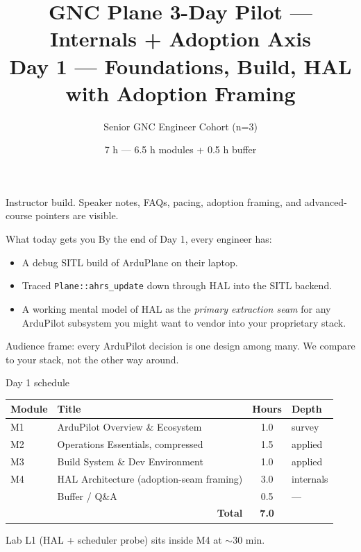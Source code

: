 \documentclass[aspectratio=169,11pt]{beamer}
\title{GNC Plane 3-Day Pilot --- Internals + Adoption Axis\\\large Day 1 --- Foundations, Build, HAL with Adoption Framing}
\subtitle{Senior GNC Engineer Cohort (n=3)}
\date{7 h --- 6.5 h modules + 0.5 h buffer}
\author{}
\institute{\copyrightline}
\begin{document}
\begin{frame}
  \titlepage
  \ifinstructor
    \footnotesize Instructor build. Speaker notes, FAQs, pacing, adoption framing, and advanced-course pointers are visible.
  \fi
\end{frame}

\begin{frame}[allowframebreaks]{What today gets you}
  By the end of Day 1, every engineer has:
  \begin{itemize}
    \item A debug SITL build of ArduPlane on their laptop.
    \item Traced \texttt{Plane::ahrs\_update} down through HAL into the SITL backend.
    \item A working mental model of HAL as the \emph{primary extraction seam} for any ArduPilot subsystem you might want to vendor into your proprietary stack.
  \end{itemize}
  \vfill
  Audience frame: every ArduPilot decision is one design among many. We compare to your stack, not the other way around.
\end{frame}

\begin{frame}[allowframebreaks]{Day 1 schedule}
  \begin{center}\small
  \begin{tabular}{|l|l|c|l|}\hline
  Module & Title & Hours & Depth \\ \hline
  M1 & ArduPilot Overview \& Ecosystem & 1.0 & survey \\ \hline
  M2 & Operations Essentials, compressed & 1.5 & applied \\ \hline
  M3 & Build System \& Dev Environment & 1.0 & applied \\ \hline
  M4 & HAL Architecture (adoption-seam framing) & 3.0 & internals \\ \hline
  & Buffer / Q\&A & 0.5 & --- \\ \hline
  \multicolumn{2}{|r|}{\textbf{Total}} & \textbf{7.0} & \\ \hline
  \end{tabular}
  \end{center}
  \vfill
  Lab L1 (HAL + scheduler probe) sits inside M4 at $\sim$30 min.
\end{frame}
\end{document}
